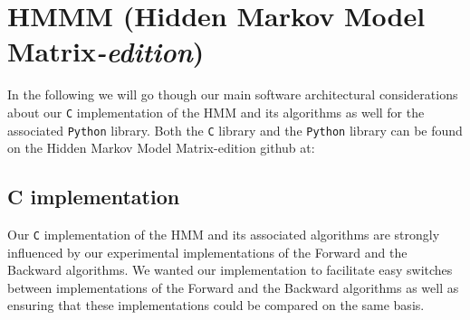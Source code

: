 \section{HMMM (Hidden Markov Model Matrix{\small\textit{-edition}})}\label{sec:hmmmlib}

In the following we will go though our main software architectural considerations about our \texttt{C} implementation of the HMM and its algorithms as well for the associated \texttt{Python} library. Both the \texttt{C} library and the \texttt{Python} library can be found on the Hidden Markov Model Matrix-edition github at: 

\subsection{C implementation}

Our \texttt{C} implementation of the HMM and its associated algorithms are strongly influenced by our experimental implementations of the Forward and the Backward algorithms. We wanted our implementation to facilitate easy switches between implementations of the Forward and the Backward algorithms as well as ensuring that these implementations could be compared on the same basis.

